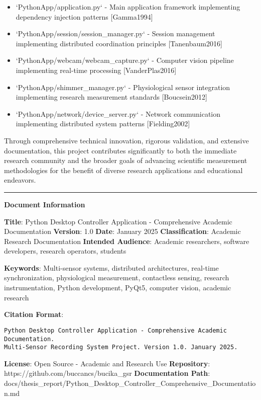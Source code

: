 \documentclass[11pt,a4paper]{article}
\begin{document}
\begin{itemize}
\item `PythonApp/application.py` - Main application framework implementing dependency injection patterns [Gamma1994]
\item `PythonApp/session/session_manager.py` - Session management implementing distributed coordination
  principles [Tanenbaum2016]
\item `PythonApp/webcam/webcam_capture.py` - Computer vision pipeline implementing real-time processing [VanderPlas2016]
\item `PythonApp/shimmer_manager.py` - Physiological sensor integration implementing research measurement
  standards [Boucsein2012]
\item `PythonApp/network/device_server.py` - Network communication implementing distributed system
  patterns [Fielding2002]

\end{itemize}
Through comprehensive technical innovation, rigorous validation, and extensive documentation, this project contributes
significantly to both the immediate research community and the broader goals of advancing scientific measurement
methodologies for the benefit of diverse research applications and educational endeavors.

\hrule

\textbf{Document Information}

\textbf{Title}: Python Desktop Controller Application - Comprehensive Academic Documentation
\textbf{Version}: 1.0
\textbf{Date}: January 2025
\textbf{Classification}: Academic Research Documentation
\textbf{Intended Audience}: Academic researchers, software developers, research operators, students

\textbf{Keywords}: Multi-sensor systems, distributed architectures, real-time synchronization, physiological measurement,
contactless sensing, research instrumentation, Python development, PyQt5, computer vision, academic research

\textbf{Citation Format}:

\begin{verbatim}
Python Desktop Controller Application - Comprehensive Academic Documentation.
Multi-Sensor Recording System Project. Version 1.0. January 2025.
\end{verbatim}

\textbf{License}: Open Source - Academic and Research Use
\textbf{Repository}: https://github.com/buccancs/bucika\_gsr
\textbf{Documentation Path}: docs/thesis\_report/Python\_Desktop\_Controller\_Comprehensive\_Documentation.md
\end{document}
